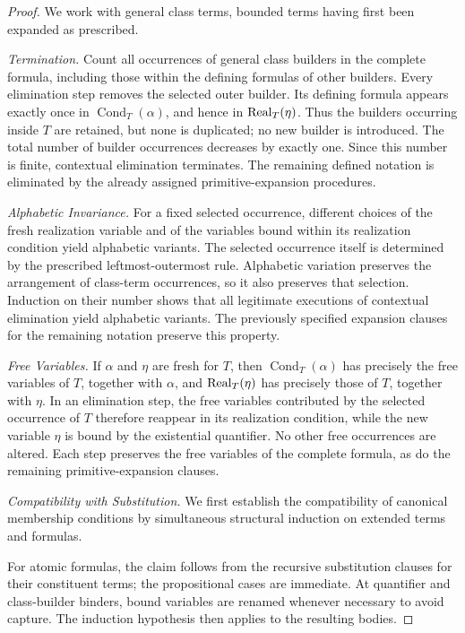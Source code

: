 \begin{proof}
We work with general class terms, bounded terms having first been
expanded as prescribed.

\medskip
\noindent\emph{Termination.}
Count all occurrences of general class builders in the complete
formula, including those within the defining formulas of other
builders. Every elimination step removes the selected outer builder.
Its defining formula appears exactly once in
\(\operatorname{Cond}_T(\alpha)\), and hence in
\(\operatorname{Real}_T(\eta)\). Thus the builders occurring inside \(T\) are
retained, but none is duplicated; no new builder is introduced.
The total number of builder occurrences decreases by exactly one.
Since this number is finite, contextual elimination terminates.
The remaining defined notation is eliminated by the already assigned
primitive-expansion procedures.

\medskip
\noindent\emph{Alphabetic Invariance.}
For a fixed selected occurrence, different choices of the fresh
realization variable and of the variables bound within its realization
condition yield alphabetic variants. The selected occurrence itself
is determined by the prescribed leftmost-outermost rule. Alphabetic
variation preserves the arrangement of class-term occurrences, so it
also preserves that selection. Induction on their number shows that
all legitimate executions of contextual elimination yield alphabetic
variants. The previously specified expansion clauses for the
remaining notation preserve this property.

\medskip
\noindent\emph{Free Variables.}
If \(\alpha\) and \(\eta\) are fresh for \(T\), then
\(\operatorname{Cond}_T(\alpha)\) has precisely the free variables
of \(T\), together with \(\alpha\), and
\(\operatorname{Real}_T(\eta)\) has precisely those of \(T\), together with
\(\eta\). In an elimination step, the free variables contributed
by the selected occurrence of \(T\) therefore reappear in its
realization condition, while the new variable \(\eta\) is bound by
the existential quantifier. No other free occurrences are altered.
Each step preserves the free variables of the complete formula, as
do the remaining primitive-expansion clauses.


\medskip
\noindent\emph{Compatibility with Substitution.}
We first establish the compatibility of canonical membership
conditions by simultaneous structural induction on extended
terms and formulas.

For atomic formulas, the claim follows from the recursive
substitution clauses for their constituent terms; the
propositional cases are immediate. At quantifier and
class-builder binders, bound variables are renamed whenever
necessary to avoid capture. The induction hypothesis then
applies to the resulting bodies.


\end{proof}
